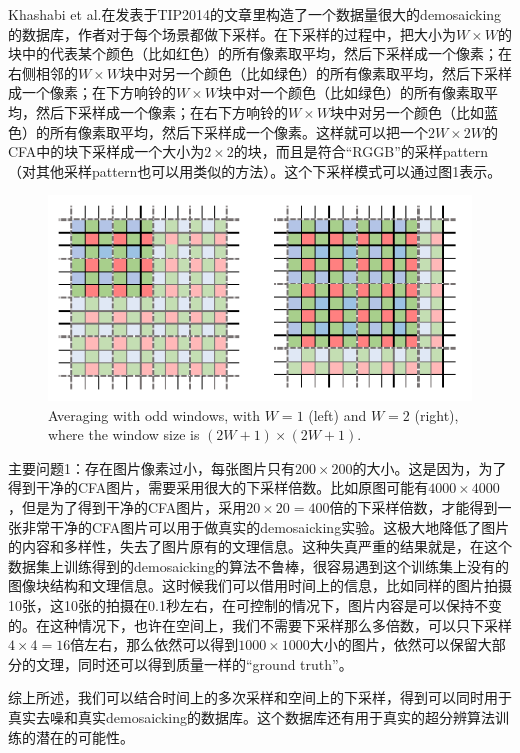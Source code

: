 \documentclass[10pt,twocolumn,letterpaper]{article}
\begin{document}
Khashabi et al.在发表于TIP2014的文章\cite{khashabi2014joint}里构造了一个数据量很大的demosaicking的数据库，作者对于每个场景都做下采样。在下采样的过程中，把大小为$W\times W$的块中的代表某个颜色（比如红色）的所有像素取平均，然后下采样成一个像素；在右侧相邻的$W\times W$块中对另一个颜色（比如绿色）的所有像素取平均，然后下采样成一个像素；在下方响铃的$W\times W$块中对一个颜色（比如绿色）的所有像素取平均，然后下采样成一个像素；在右下方响铃的$W\times W$块中对另一个颜色（比如蓝色）的所有像素取平均，然后下采样成一个像素。这样就可以把一个$2W\times2W$的CFA中的块下采样成一个大小为$2\times2$的块，而且是符合``RGGB''的采样pattern（对其他采样pattern也可以用类似的方法）。这个下采样模式可以通过图1表示。

\begin{figure}
\centering
\includegraphics[width=0.95\linewidth]{CFA.png}
\caption{Averaging with odd windows, with $W = 1$ (left) and $W = 2$ (right),
where the window size is $(2W + 1)\times (2W + 1)$.
}
\label{fig1}
\end{figure}


主要问题1：存在图片像素过小，每张图片只有$200\times200$的大小。这是因为，为了得到干净的CFA图片，需要采用很大的下采样倍数。比如原图可能有$4000\times4000$，但是为了得到干净的CFA图片，采用$20\times20=400$倍的下采样倍数，才能得到一张非常干净的CFA图片可以用于做真实的demosaicking实验。这极大地降低了图片的内容和多样性，失去了图片原有的文理信息。这种失真严重的结果就是，在这个数据集上训练得到的demosaicking的算法不鲁棒，很容易遇到这个训练集上没有的图像块结构和文理信息。这时候我们可以借用时间上的信息，比如同样的图片拍摄10张，这10张的拍摄在0.1秒左右，在可控制的情况下，图片内容是可以保持不变的。在这种情况下，也许在空间上，我们不需要下采样那么多倍数，可以只下采样$4\times4=16$倍左右，那么依然可以得到$1000\times1000$大小的图片，依然可以保留大部分的文理，同时还可以得到质量一样的``ground truth''。

综上所述，我们可以结合时间上的多次采样和空间上的下采样，得到可以同时用于真实去噪和真实demosaicking的数据库。这个数据库还有用于真实的超分辨算法训练的潜在的可能性。
\end{document}
